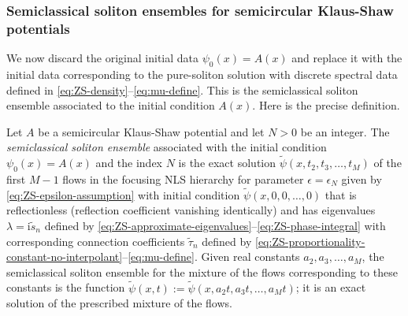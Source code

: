 \documentclass[12pt]{amsart}
\numberwithin{equation}{section}
\newcommand{\ii}{\mathrm{i}}
\begin{document}
\subsubsection{Semiclassical soliton ensembles for semicircular Klaus-Shaw potentials}
We now discard the original initial data $\psi_0(x)=A(x)$ and replace it with the initial 
data corresponding to the pure-soliton solution with discrete spectral data defined in 
\eqref{eq:ZS-density}--\eqref{eq:mu-define}.  This is the semiclassical 
soliton ensemble associated to the initial condition $A(x)$.  Here is the precise definition.
\begin{definition}
Let $A$ be a semicircular Klaus-Shaw potential and let $N>0$ be an integer.  The \emph{semiclassical soliton ensemble} associated with the initial condition $\psi_0(x)=A(x)$ and the index $N$ is the exact solution $\widetilde{\psi}(x,t_2,t_3,\dots,t_M)$ of the first $M-1$ flows in the focusing NLS hierarchy for parameter $\epsilon=\epsilon_N$ given by \eqref{eq:ZS-epsilon-assumption} with initial condition $\widetilde{\psi}(x,0,0,\dots,0)$ that is reflectionless (reflection coefficient vanishing identically) and has eigenvalues $\lambda=\ii\widetilde{s}_n$ defined by \eqref{eq:ZS-approximate-eigenvalues}--\eqref{eq:ZS-phase-integral} with corresponding connection coefficients $\widetilde{\tau}_n$ defined by \eqref{eq:ZS-proportionality-constant-no-interpolant}--\eqref{eq:mu-define}.  Given real constants $a_2,a_3,\dots,a_M$, the semiclassical soliton ensemble for the mixture of the flows corresponding to these constants is the function $\widetilde{\psi}(x,t):=\widetilde{\psi}(x,a_2t,a_3t,\dots,a_Mt)$; it is an exact solution of the prescribed mixture of the flows.
\label{def:SSE}
\end{definition}
\end{document}
